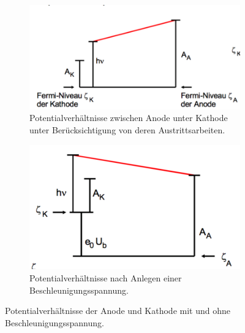 \begin{figure}[H]
  \centering
  \begin{subfigure}{0.48\textwidth}
    \centering
    \includegraphics[width = \textwidth]{NacktbilderMilaKunis/potentialohneub.pdf}
    \caption{Potentialverhältnisse zwischen Anode unter Kathode
    unter Berücksichtigung von deren Austrittsarbeiten\cite{anleitung}.}
    \label{fig:potentialohneub}
  \end{subfigure}
  \begin{subfigure}{0.48\textwidth}
    \centering
    \includegraphics[width = \textwidth]{NacktbilderMilaKunis/potentialmitub.pdf}
    \caption{Potentialverhältnisse nach Anlegen einer Beschleunigungsspannung\cite{anleitung}.}
    \label{fig:potentialmitub}
  \end{subfigure}
  \caption{Potentialverhältnisse der Anode und Kathode mit und ohne Beschleunigungsspannung.}
  \label{fig:potentialverhaeltnisse}
\end{figure}
